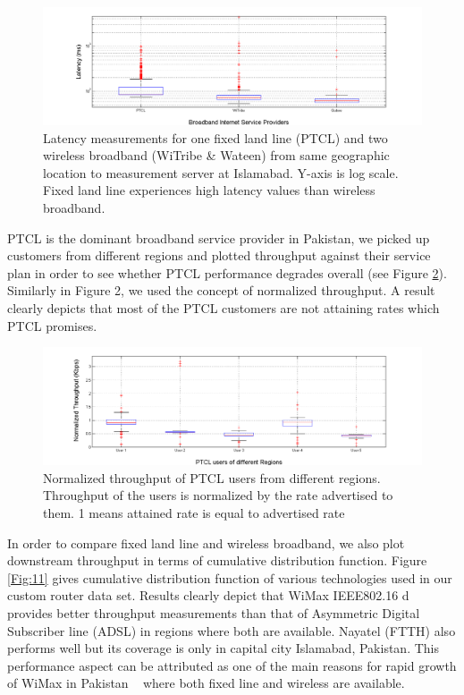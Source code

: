 \documentclass{sig-alternate-10pt}
\begin{document}
\begin{sloppypar}
\begin{figure}[t!]
\begin {center}
   \includegraphics[height=0.2 \textheight,width=0.5 \textwidth]{9.png}
   \end {center}
 \caption{Latency measurements for one fixed land line (PTCL) and two wireless broadband (WiTribe \& Wateen) from same geographic location to measurement server at Islamabad. Y-axis is log scale. Fixed land line experiences high latency values than wireless broadband.}\label{Fig:9}
\end{figure}

PTCL is the dominant broadband service provider in Pakistan, we picked up customers from different regions and plotted throughput against their service plan in order to see whether PTCL performance degrades overall (see Figure \ref{Fig:10}). Similarly in Figure 2, we used the concept of normalized throughput. A result clearly depicts that most of the PTCL customers are not attaining rates which PTCL promises.
\begin{figure}[t!]
\begin {center}
      \includegraphics[height=0.2 \textheight,width=0.5 \textwidth]{15.png}
   \end {center}
 \caption{Normalized throughput of PTCL users from different regions. Throughput of the users is normalized by the rate advertised to them. 1 means attained rate is equal to advertised rate} \label{Fig:10}
\end{figure}

\indent In order to compare fixed land line and wireless broadband, we also plot downstream throughput in terms of cumulative distribution function. Figure \ref{Fig:11} gives cumulative distribution function of various technologies used in our custom router data set. Results clearly depict that WiMax IEEE802.16 d provides better throughput measurements than that of Asymmetric Digital Subscriber line (ADSL) in regions where both are available. Nayatel (FTTH) also performs well but its coverage is only in capital city Islamabad, Pakistan.  This performance aspect can be attributed as one of the main reasons for rapid growth of WiMax in Pakistan ~\cite{28} where both fixed line and wireless are available.


\end{sloppypar}
\end{document}
